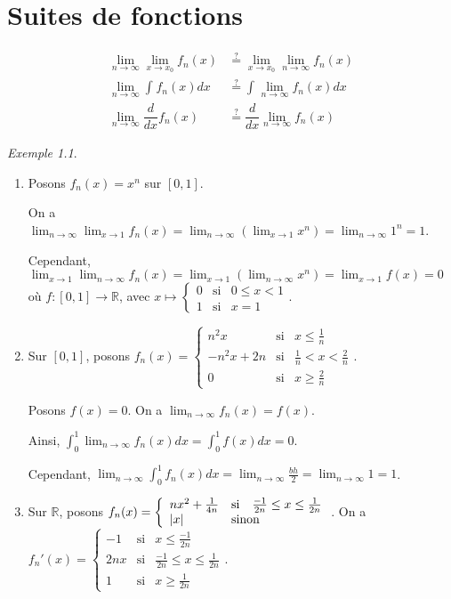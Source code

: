 \documentclass{report}
\newcommand*{\dlim}[3]{\displaystyle\lim_{#1 \to #2}#3}
\newcommand*{\dint}[3]{\displaystyle\int_{#1}^{#2}#3}
\newcommand*{\abs}[1]{\left| #1 \right|}
\newcommand*{\reels}{\mathbb{R}}
\theoremstyle{definition}
\theoremstyle{remark}
\newtheorem*{exem}{Exemple}
\begin{document}
	\chapter{Suites de fonctions}
	\begin{align*}
		\dlim{n}{\infty}{\dlim{x}{x_0}{f_n(x)}} &\overset{?}{=} \dlim{x}{x_0}{\dlim{n}{\infty}{f_n(x)}}\\
		\dlim{n}{\infty}{\dint{}{}{f_n(x)dx}} &\overset{?}{=} \dint{}{}{\dlim{n}{\infty}{f_n(x)}dx}\\
		\dlim{n}{\infty}{\dfrac{d}{dx}f_n(x)} &\overset{?}{=} \dfrac{d}{dx}\dlim{n}{\infty}{f_n(x)}
	\end{align*}
	\begin{exem}
		~

		\begin{enumerate}
			\item Posons $f_n(x) = x^n$ sur $[0,1]$.

			On a $\dlim{n}{\infty}{\dlim{x}{1}{f_n(x)}} = \dlim{n}{\infty}{\left( \dlim{x}{1}{x^n} \right)} = \dlim{n}{\infty}{1^n} = 1$.

			Cependant, $\dlim{x}{1}{\dlim{n}{\infty}{f_n(x)}} = \dlim{x}{1}{\left( \dlim{n}{\infty}{x^n} \right)} = \dlim{x}{1}{f(x)} = 0$ o\`u $f:[0,1] \to \reels$, avec $x \mapsto \left\lbrace \begin{array}{lll}
				0&\text{si}&0 \leq x<1\\
				1&\text{si}&x=1
			\end{array} \right.$.
			\item Sur $[0,1]$, posons $f_n(x) = \left\lbrace \begin{array}{lll}
				n^2x&\text{si}&x \leq \frac{1}{n}\\
				-n^2x+2n&\text{si}&\frac{1}{n}<x<\frac{2}{n}\\
				0&\text{si}&x \geq \frac{2}{n}
			\end{array} \right.$.

			Posons $f(x)= 0$. On a $\dlim{n}{\infty}{f_n(x)} = f(x)$.

			Ainsi, $\dint{0}{1}{\dlim{n}{\infty}{f_n(x)}dx} = \dint{0}{1}{f(x)dx} = 0$.

			Cependant, $\dlim{n}{\infty}{\dint{0}{1}{f_n(x)dx}} = \dlim{n}{\infty}{\frac{bh}{2}} = \dlim{n}{\infty}{1} = 1$.
			\item Sur $\reels$, posons $f_n(x) = \left\lbrace \begin{array}{lll}
				nx^2+\frac{1}{4n}&\text{si}&\frac{-1}{2n} \leq x \leq \frac{1}{2n}\\
				\abs{x}&\multicolumn{2}{l}{\text{sinon}}
			\end{array} \right.$. On a $f_n'(x) = \left\{ \begin{array}{lll}
				-1&\text{si}&x \leq \frac{-1}{2n}\\
				2nx&\text{si}&\frac{-1}{2n} \leq x \leq \frac{1}{2n}\\
				1&\text{si}&x \geq \frac{1}{2n}
			\end{array} \right.$.


\end{enumerate}
\end{exem}
\end{document}
